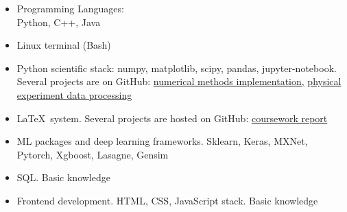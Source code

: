 \begin{itemize}
	\item Programming Languages: \\ 
	Python, C++, Java
	\item Linux terminal (Bash)
	\item Python scientific stack: 
	numpy, matplotlib, scipy, pandas, jupyter-notebook. Several projects are on GitHub: \href{https://github.com/stdereka/calc_math_hometask}{numerical methods implementation,} \href{https://github.com/stdereka/PRM_MIPT}{physical experiment data processing}
	\item \LaTeX~system. Several projects are hosted on GitHub: \href{https://github.com/stdereka/yavor\_curse}{coursework report}
	\item ML packages and deep learning frameworks. Sklearn, Keras, MXNet, Pytorch, Xgboost, Lasagne,
	Gensim
	\item SQL. Basic knowledge
	\item Frontend development. HTML, CSS, JavaScript stack. Basic knowledge
\end{itemize}








